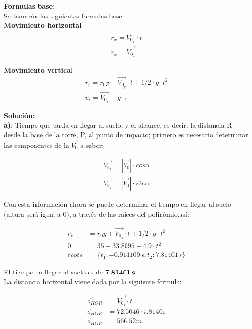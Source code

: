 \documentclass[11pt,letterpaper]{article}
\begin{document}
\textbf{Formulas base:}\\

Se tomarán las siguientes formulas base:\\

\textbf{Movimiento horizontal}\\

\begin{align}
\boxed{ r_{x} = \vec{V_{0_{x}} \cdot t}}\\
\boxed{ v_{x} = \vec{V_{0_{x}}}}
\end{align}

\textbf{Movimiento vertical}\\

\begin{align}
\boxed{ r_{y} = r_{0}y + \vec{V_{0_{y}}} \cdot t + 1/2 \cdot g \cdot t^2}\\
\boxed{ v_{y} = \vec{V_{0_{x}}} + g \cdot t}
\end{align}


\textbf{Solución:}\\

\textbf{a)}: Tiempo que tarda en llegar al suelo, y el alcance, es decir, la distancia R desde la base de la torre, P, al punto de impacto; primero es necesario determinar las componentes de la $\vec{V_{0}}$ a saber:

\begin{align}
\boxed{ \vec{V_{0_{x}}} = |\vec{V_{0}}| \cdot cos \alpha}\\
\boxed{ \vec{V_{0_{y}}} = |\vec{V_{0}}| \cdot sin \alpha}
\end{align}

Con esta información ahora se puede determinar el tiempo en llegar al suelo (altura será igual a $0$), a través de las raices del polinómio,así:

\begin{align*}
	r_{y} &= r_{0}y + \vec{V_{0_{y}}} \cdot t + 1/2 \cdot g \cdot t^2\\
	0 &= 35 + 33.8095 - 4.9 \cdot t^2\\
	roots &= \{ t_{1}: -0.914109\,s, t_{2}: 7.81401\,s \}
\end{align*}

El tiempo en llegar al suelo es de $\textbf{7.81401\,s}$.\\

La distancia horizontal viene dada por la siguiente formula:

\begin{align*}
	d_{HOR} &= \vec{V_{0_{x}}} \cdot t \\
	d_{HOR} &= 72.5046 \cdot 7.81401 \\
	d_{HOR} &= 566.52 m
\end{align*}
\end{document}
